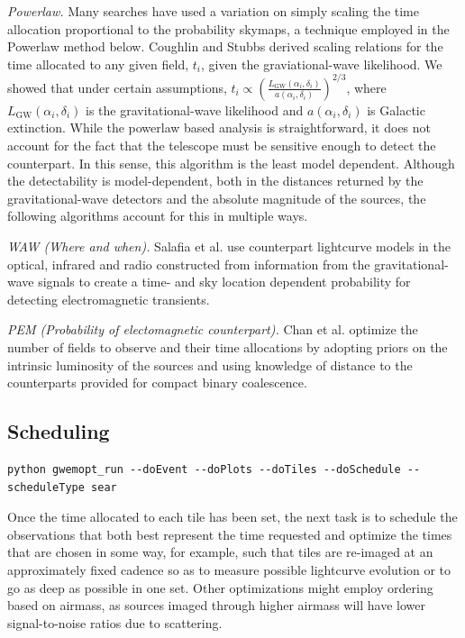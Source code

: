 \documentclass[twocolumn]{aastex61}
\begin{document}
\emph{Powerlaw.} Many searches have used a variation on simply scaling the time allocation proportional to the probability skymaps, a technique employed in the Powerlaw method below. Coughlin and Stubbs \cite{CoSt2016a} derived scaling relations for the time allocated to any given field, $t_i$, given the graviational-wave likelihood. We showed that under certain assumptions, $t_i \propto \left(\frac{L_\textrm{GW}(\alpha_i,\delta_i)}{a(\alpha_i,\delta_i)}\right)^{2/3}$, where $L_\textrm{GW}(\alpha_i,\delta_i)$ is the gravitational-wave likelihood and $a(\alpha_i,\delta_i)$ is Galactic extinction.  While the powerlaw based analysis is straightforward, it does not account for the fact that the telescope must be sensitive enough to detect the counterpart. In this sense, this algorithm is the least model dependent. Although the detectability is model-dependent, both in the distances returned by the gravitational-wave detectors and the absolute magnitude of the sources, the following algorithms account for this in multiple ways.

\emph{WAW (Where and when).} Salafia et al. \cite{SoCo2017} use counterpart lightcurve models in the optical, infrared and radio constructed from information from the gravitational-wave signals to create a time- and sky location dependent probability for detecting electromagnetic transients.

\emph{PEM (Probability of electomagnetic counterpart).} Chan et al. \cite{ChHu2017} optimize the number of fields to observe and their time allocations by adopting priors on the intrinsic luminosity of the sources and using knowledge of distance to the counterparts provided for compact binary coalescence.

\subsection{Scheduling}
\begin{lstlisting}
python gwemopt_run --doEvent --doPlots --doTiles --doSchedule --scheduleType sear
\end{lstlisting}
Once the time allocated to each tile has been set, the next task is to schedule the observations that both best represent the time requested and optimize the times that are chosen in some way, for example, such that tiles are re-imaged at an approximately fixed cadence so as to measure possible lightcurve evolution or to go as deep as possible in one set.
Other optimizations might employ ordering based on airmass, as sources imaged through higher airmass will have lower signal-to-noise ratios due to scattering.
\end{document}
